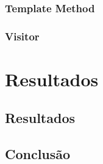 \documentclass[
	12pt,				%
	openright,			%
	twoside,			%
	a4paper,			%
	english,			%
	french,				%
	spanish,			%
	brazil				%
	]{abntex2}
\begin{document}
\section{Template Method}
\section{Visitor}

\part{Resultados}

%
\chapter{Resultados}

%
\chapter{Conclusão}



\postextual







\printindex
\end{document}
